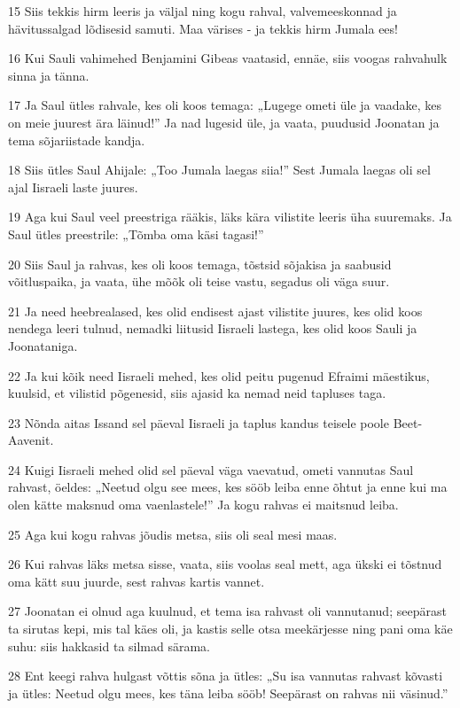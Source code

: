 \par 15 Siis tekkis hirm leeris ja väljal ning kogu rahval, valvemeeskonnad ja hävitussalgad lõdisesid samuti. Maa värises - ja tekkis hirm Jumala ees!
\par 16 Kui Sauli vahimehed Benjamini Gibeas vaatasid, ennäe, siis voogas rahvahulk sinna ja tänna.
\par 17 Ja Saul ütles rahvale, kes oli koos temaga: „Lugege ometi üle ja vaadake, kes on meie juurest ära läinud!” Ja nad lugesid üle, ja vaata, puudusid Joonatan ja tema sõjariistade kandja.
\par 18 Siis ütles Saul Ahijale: „Too Jumala laegas siia!” Sest Jumala laegas oli sel ajal Iisraeli laste juures.
\par 19 Aga kui Saul veel preestriga rääkis, läks kära vilistite leeris üha suuremaks. Ja Saul ütles preestrile: „Tõmba oma käsi tagasi!”
\par 20 Siis Saul ja rahvas, kes oli koos temaga, tõstsid sõjakisa ja saabusid võitluspaika, ja vaata, ühe mõõk oli teise vastu, segadus oli väga suur.
\par 21 Ja need heebrealased, kes olid endisest ajast vilistite juures, kes olid koos nendega leeri tulnud, nemadki liitusid Iisraeli lastega, kes olid koos Sauli ja Joonataniga.
\par 22 Ja kui kõik need Iisraeli mehed, kes olid peitu pugenud Efraimi mäestikus, kuulsid, et vilistid põgenesid, siis ajasid ka nemad neid tapluses taga.
\par 23 Nõnda aitas Issand sel päeval Iisraeli ja taplus kandus teisele poole Beet-Aavenit.
\par 24 Kuigi Iisraeli mehed olid sel päeval väga vaevatud, ometi vannutas Saul rahvast, öeldes: „Neetud olgu see mees, kes sööb leiba enne õhtut ja enne kui ma olen kätte maksnud oma vaenlastele!” Ja kogu rahvas ei maitsnud leiba.
\par 25 Aga kui kogu rahvas jõudis metsa, siis oli seal mesi maas.
\par 26 Kui rahvas läks metsa sisse, vaata, siis voolas seal mett, aga ükski ei tõstnud oma kätt suu juurde, sest rahvas kartis vannet.
\par 27 Joonatan ei olnud aga kuulnud, et tema isa rahvast oli vannutanud; seepärast ta sirutas kepi, mis tal käes oli, ja kastis selle otsa meekärjesse ning pani oma käe suhu: siis hakkasid ta silmad särama.
\par 28 Ent keegi rahva hulgast võttis sõna ja ütles: „Su isa vannutas rahvast kõvasti ja ütles: Neetud olgu mees, kes täna leiba sööb! Seepärast on rahvas nii väsinud.”
